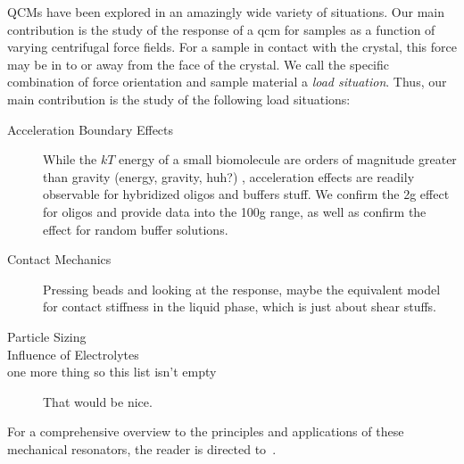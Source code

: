 QCMs have been explored in an amazingly wide variety of situations.  Our
main contribution is the study of the response of a \gls{qcm} for samples as a
function of varying centrifugal force fields.  For a sample in contact with
the crystal, this force may be in to or away from the face of the
crystal.  We call the specific combination of force orientation and sample
material a \textit{load situation}.  Thus, our main contribution is the
study of the following load situations:

\begin{description}
\item[{Acceleration Boundary Effects}] While the $kT$ energy of a
small biomolecule are orders of magnitude greater than gravity (energy,
gravity, huh?)
, acceleration effects are readily observable for hybridized
oligos and buffers stuff.  We confirm the 2g effect for oligos and provide
data into the 100g range, as well as confirm the effect for random buffer
solutions.
\item[{Contact Mechanics}] Pressing beads and looking at the response,
 maybe the equivalent model for contact stiffness in the liquid phase,
 which is just about shear stuffs.
\item[{Particle Sizing}]
\item[{Influence of Electrolytes}]
\item[{one more thing so this list isn't empty}] That would be nice.
\end{description}

For a comprehensive overview to the principles and applications of these
mechanical resonators, the reader is directed to~\cite{steinemreview}.

